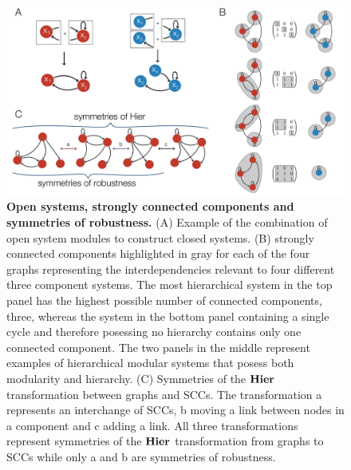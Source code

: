 \begin{figure}[!ht]
\centering
\noindent\includegraphics[width=0.9\columnwidth]{fig/modsccsym.pdf}
\caption{{\bf Open systems, strongly connected components and symmetries of robustness.} (A) Example of the combination of open system modules to construct closed systems. (B) strongly connected components highlighted in gray for each of the four graphs representing the interdependencies relevant to four different three component systems. The most hierarchical system in the top panel has the highest possible number of connected components, three, whereas the system in the bottom panel containing a single cycle and therefore posessing no hierarchy contains only one connected component. The two panels in the middle represent examples of hierarchical modular systems that posess both modularity and hierarchy. (C) Symmetries of the $\mathbf{Hier}$ transformation between graphs and SCCs. The transformation a represents an interchange of SCCs, b moving a link between nodes in a component and c adding a link. All three transformations represent symmetries of the $\mathbf{Hier}$ transformation from graphs to SCCs while only a and b are symmetries of robustness.}
\label{fig:modsccsym}
\end{figure}

\pagebreak




